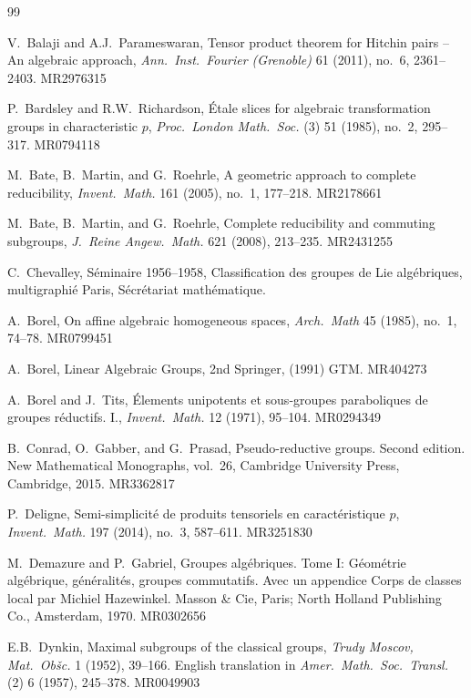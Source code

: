 \documentclass[11pt,a4paper]{article}
\theoremstyle{plain}
\theoremstyle{definition}
\begin{document}
\begin{thebibliography}{99}

V.~Balaji and A.J.~Parameswaran, Tensor product theorem for Hitchin pairs -- An algebraic approach, \textit{Ann.~Inst.~Fourier (Grenoble)} 61 (2011), no.~6, 2361--2403. MR2976315

P.~Bardsley and R.W.~Richardson, \'Etale slices for algebraic transformation groups in characteristic $p$, \textit{Proc.~London Math.~Soc.} (3) 51 (1985), no.~2, 295--317. MR0794118

M.~Bate, B.~Martin, and G.~Roehrle, A geometric approach to complete reducibility, \textit{Invent.~Math.} 161 (2005), no.~1, 177--218. MR2178661

M.~Bate, B.~Martin, and G.~Roehrle, Complete reducibility and commuting subgroups, \textit{J.~Reine Angew.~Math.} 621 (2008), 213--235. MR2431255

C.~Chevalley, S\'eminaire 1956--1958, Classification des groupes de Lie alg\'ebriques, multigraphi\'e Paris, S\'ecr\'etariat math\'ematique.

A.~Borel, On affine algebraic homogeneous spaces, \textit{Arch.~Math} 45 (1985), no.~1, 74--78. MR0799451

A.~Borel, Linear Algebraic Groups, 2nd Springer, (1991) GTM. MR404273

A.~Borel and J.~Tits, \'Elements unipotents et sous-groupes paraboliques de groupes r\'eductifs. I., \textit{Invent.~Math.} 12 (1971), 95--104. MR0294349

B.~Conrad, O.~Gabber, and G.~Prasad, Pseudo-reductive groups. Second edition. New Mathematical Monographs, vol.~26, Cambridge University Press, Cambridge, 2015. MR3362817

P.~Deligne, Semi-simplicit\'e de produits tensoriels en caract\'eristique $p$, \textit{Invent.~Math.} 197 (2014), no.~3, 587--611. MR3251830

M.~Demazure and P.~Gabriel, Groupes alg\'ebriques. Tome I: G\'eom\'etrie alg\'ebrique, g\'en\'eralit\'es, groupes commutatifs. Avec un appendice Corps de classes local par Michiel Hazewinkel. Masson \& Cie, Paris; North Holland Publishing Co., Amsterdam, 1970. MR0302656

E.B.~Dynkin, Maximal subgroups of the classical groups, \textit{Trudy Moscov, Mat.~Ob\v{s}c.} 1 (1952), 39--166. English translation in \textit{Amer.~Math.~Soc.~Transl.} (2) 6 (1957), 245--378. MR0049903


\end{thebibliography}
\end{document}
